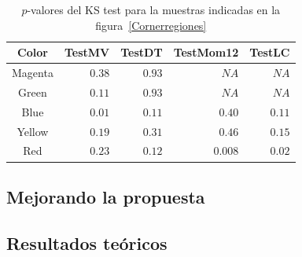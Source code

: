 \begin{table}[htb]
	\centering
	\caption{$p$-valores del KS test para la muestras indicadas en la figura~\ref{Cornerregiones}}
	\label{pvaluesTrueNestedSamples}
	\begin{tabular}{c*4{r}}
		\toprule
		Color       &  TestMV    &  TestDT    &  TestMom12  &  TestLC\\
		\midrule
		Magenta     & $ 0.38$    & $ 0.93 $   & $ NA $     & $  NA$\\
		Green       & $ 0.11$    & $ 0.93$    & $ NA $     & $   NA$\\
		Blue        & $ 0.01 $   & $0.11 $    & $ 0.40$    & $ 0.11$\\
		Yellow      & $0.19$     & $0.31$     & $ 0.46 $   & $0.15$\\
		Red         & $0.23$     & $0.12$     & $ 0.008$   & $0.02$\\
		\bottomrule
	\end{tabular}
\end{table}

\subsection{Mejorando la propuesta}
\label{mejorando}

\subsection{Resultados teóricos}